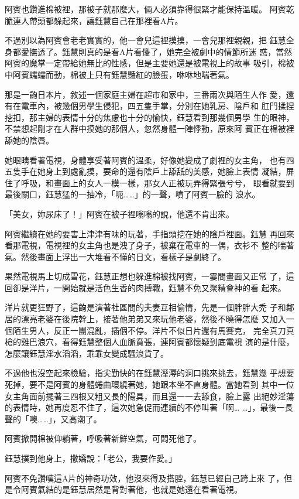 阿賓也鑽進棉被裡，那被子就那麼大，倆人必須靠得很緊才能保持溫暖。
阿賓乾脆連人帶頭都躲起來，讓鈺慧自己在那裡看A片。

不過別以為阿賓會老老實實的，他一會兒這裡摸摸，一會兒那裡親親，把
鈺慧全身都愛撫透了。鈺慧則真的是看A片看傻了，她完全被劇中的情節所迷
惑，當然阿賓的魔掌一定帶給她無比的性感，但是主要她還是被電視上的故事
吸引，棉被中阿賓蠕蠕而動，棉被上只有鈺慧豔紅的臉蛋，咻咻地喘著氣。

那是一齣日本片，敘述一個家庭主婦在超市和家中，三番兩次與陌生人作
愛，還有在電車內，被幾個男學生侵犯，四五隻手掌，分別在她乳房、陰戶和
肛門揉捏挖扣，那主婦的表情十分的焦慮也十分的愉快，鈺慧看到那幾個男學
生的眼神，不禁想起剛才在人群中摸她的那個人，忽然身體一陣悸動，原來阿
賓正在棉被裡舔她的陰唇。

她眼睛看著電視，身體享受著阿賓的溫柔，好像她變成了劇裡的女主角，
也有四五隻手在她身上到處亂摸，要命的還有陰戶上舔舐的美感，她臉上表情
凝結，屏住了呼吸，和畫面上的女人一模一樣，那女人正被玩弄得緊張兮兮，
眼看就要到最後關口，鈺慧猛的一抽冷，「呃……」的一聲，噴了阿賓一臉的
浪水。

「美女，妳尿床了！」阿賓在被子裡嗡嗡的說，他還不肯出來。

阿賓繼續在她的要害上津津有味的玩著，手指頭挖在她的陰戶裡面。鈺慧
再回來看那電視，電視裡的女主角也是洩了身子，被棄在電車的一偶，衣衫不
整的喘著氣。然後畫面上浮出一大堆看不懂的日文，看樣子是劇終了。

果然電視馬上切成雪花，鈺慧正想也躲進棉被找阿賓，一霎間畫面又正常
了，這回卻是洋片，一開始就是活色生香的肉搏戰，鈺慧不免又聚精會神的看
起來。

洋片就更狂野了，這齣是演著社區間的夫妻互相偷情，先是一個胖胖大禿
子和鄰居的漂亮老婆在後院幹上，接著他弟弟又來玩他老婆，然後不曉得怎麼
又加入一個陌生男人，反正一團混亂，插個不停。洋片不似日片還有馬賽克，
完全真刀真槍的雞巴浪穴，看得鈺慧整個人血脈賁張，連阿賓都懷疑到底電視
演的是什麼，怎麼讓鈺慧淫水滔滔，乖乖女變成騷浪貨了。

不過他也沒空起來檢驗，指尖勤快的在鈺慧溼溽的洞口挑來挑去，鈺慧幾
乎想要死掉，要不是阿賓的身體蜷曲環繞著她，她跟本坐不直身體。當她看到
其中一位女主角面前擺著三四根又粗又長的陽具，而且還一一去舔食，臉上露
出絕妙淫蕩的表情時，她再度忍不住了，這次她急促而連續的不停叫著「啊…
…」，最後一長聲的「噢……」，又高潮了。

阿賓掀開棉被仰躺著，呼吸著新鮮空氣，可悶死他了。

鈺慧撲到他身上，撒嬌說：「老公，我要作愛。」

阿賓不免讚嘆這A片的神奇功效，他沒來得及搭腔，鈺慧已經自己跨上來
了，但是令阿賓氣結的是鈺慧居然是背對著他，也就是她還在看著電視。

